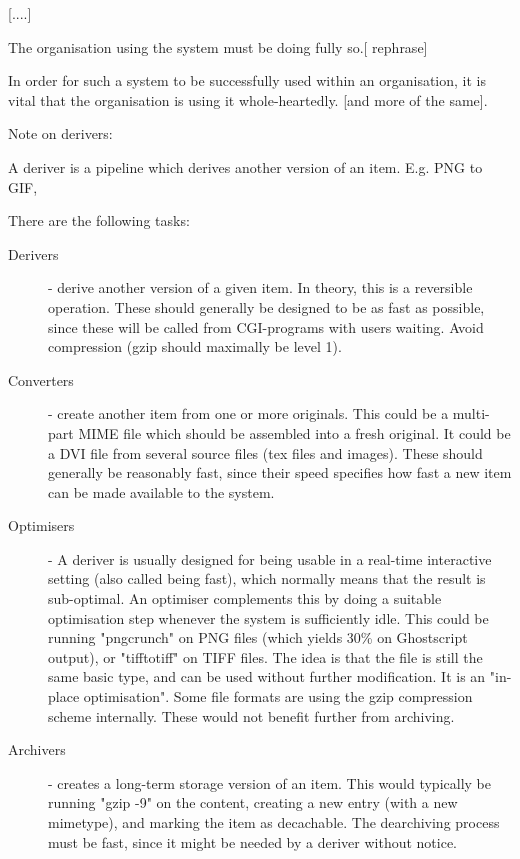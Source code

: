 [....]


The organisation using the system must be doing fully so.[ rephrase]

In order for such a system to be successfully used within an
organisation, it is vital that the organisation is using it
whole-heartedly.  [and more of the same].


Note on derivers:

A deriver is a pipeline which derives another version of an item.
E.g. PNG to GIF,

There are the following tasks:
\begin{description}
  
\item[Derivers] - derive another version of a given item.  In theory,
  this is a reversible operation.  These should generally be designed
  to be as fast as possible, since these will be called from
  CGI-programs with users waiting.  Avoid compression (gzip should
  maximally be level 1).

\item[Converters] - create another item from one or more originals.
  This could be a multi-part MIME file which should be assembled into
  a fresh original.  It could be a DVI file from several source files
  (tex files and images).  These should generally be reasonably fast,
  since their speed specifies how fast a new item can be made
  available to the system.

\item[Optimisers] - A deriver is usually designed for being usable in
  a real-time interactive setting (also called being fast), which
  normally means that the result is sub-optimal.  An optimiser
  complements this by doing a suitable optimisation step whenever the
  system is sufficiently idle.  This could be running "pngcrunch" on
  PNG files (which yields 30\% on Ghostscript output), or "tifftotiff"
  on TIFF files.  The idea is that the file is still the same basic
  type, and can be used without further modification.  It is an
  "in-place optimisation".  Some file formats are using the gzip
  compression scheme internally.  These would not benefit further from
  archiving.
  
\item[Archivers] - creates a long-term storage version of an item.
  This would typically be running "gzip -9" on the content, creating a
  new entry (with a new mimetype), and marking the item as decachable.
  The dearchiving process must be fast, since it might be needed by a
  deriver without notice.
  

\end{description}
